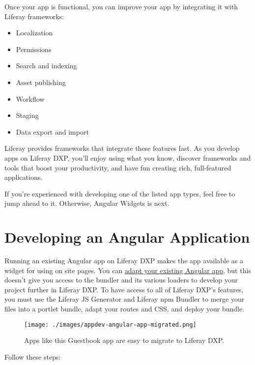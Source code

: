 Once your app is functional, you can improve your app by integrating it
with Liferay frameworks:

\begin{itemize}
\tightlist
\item
  Localization
\item
  Permissions
\item
  Search and indexing
\item
  Asset publishing
\item
  Workflow
\item
  Staging
\item
  Data export and import
\end{itemize}

Liferay provides frameworks that integrate these features fast. As you
develop apps on Liferay DXP, you'll enjoy using what you know, discover
frameworks and tools that boost your productivity, and have fun creating
rich, full-featured applications.

If you're experienced with developing one of the listed app types, feel
free to jump ahead to it. Otherwise, Angular Widgets is next.

\chapter{Developing an Angular
Application}\label{developing-an-angular-application}

Running an existing Angular app on Liferay DXP makes the app available
as a widget for using on site pages. You can
\href{/docs/7-2/reference/-/knowledge_base/r/adapting-existing-apps-to-run-on-product}{adapt
your existing Angular app}, but this doesn't give you access to the
bundler and its various loaders to develop your project further in
Liferay DXP. To have access to all of Liferay DXP's features, you must
use the Liferay JS Generator and Liferay npm Bundler to merge your files
into a portlet bundle, adapt your routes and CSS, and deploy your
bundle.

\begin{figure}
\centering
\texttt{[image: ./images/appdev-angular-app-migrated.png]}
\caption{Apps like this Guestbook app are easy to migrate to Liferay
DXP.}
\end{figure}

Follow these steps:

